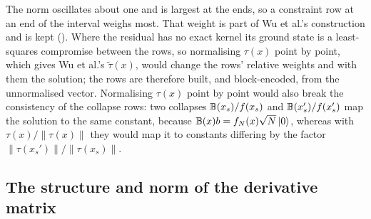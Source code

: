 The norm oscillates about one and is largest at the ends, so a constraint row at an end of the interval weighs most. That weight is part of Wu et al.'s construction and is kept (). Where the residual has no exact kernel its ground state is a least-squares compromise between the rows, so normalising $\tau(x)$ point by point, which gives Wu et al.'s $\tilde\tau(x)$, would change the rows' relative weights and with them the solution; the rows are therefore built, and block-encoded, from the unnormalised vector. Normalising $\tau(x)$ point by point would also break the consistency of the collapse rows: two collapses $\mathbb{B}(x_s)/f(x_s)$ and $\mathbb{B}(x_s')/f(x_s')$ map the solution to the same constant, because $\mathbb{B}(x)b=f_N(x)\sqrt N\ket0$, whereas with $\tau(x)/\|\tau(x)\|$ they would map it to constants differing by the factor $\|\tau(x_s')\|/\|\tau(x_s)\|$.

\subsection{The structure and norm of the derivative matrix}
\label{app:cheb-G-norm}

